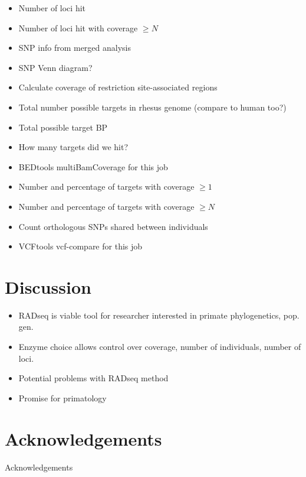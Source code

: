 \documentclass[12pt]{article}
\begin{document}
\begin{itemize}
	\item Number of loci hit
	\item Number of loci hit with coverage $\ge N$
	\item SNP info from merged analysis
	\item SNP Venn diagram?
	\item Calculate coverage of restriction site-associated regions
	\item Total number possible targets in rhesus genome (compare to human too?)
	\item Total possible target BP
	\item How many targets did we hit?
	\item BEDtools multiBamCoverage for this job
	\item Number and percentage of targets with coverage $\ge 1$
	\item Number and percentage of targets with coverage $\ge N$
	\item Count orthologous SNPs shared between individuals
	\item VCFtools vcf-compare for this job
\end{itemize}

\section{Discussion}
\begin{itemize}
	\item RADseq is viable tool for researcher interested in primate phylogenetics, pop. gen.
	\item Enzyme choice allows control over coverage, number of individuals, number of loci.
	\item Potential problems with RADseq method
	\item Promise for primatology
\end{itemize}

\section{Acknowledgements}
Acknowledgements
\end{document}
